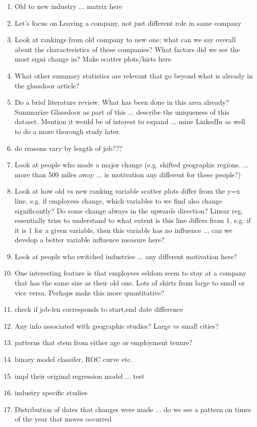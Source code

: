 \documentclass{amsart}[12pt]
\begin{document}
\begin{enumerate}
    \item Old to new industry ... matrix here 
    \item Let's focus on Leaving a company, not just different role in same company 
    \item Look at rankings from old company to new one; what can we say overall about 
         the characteristics of these companies?  What factors did we see the most signi
         change in? Make scatter plots/hists here 
    \item What other summary statistics are relevant that go beyond what is already in 
          the glassdoor article? 
    \item Do a brief literature review.  What has been done in this area already?
          Summarize Glassdoor as part of this ... describe the uniqueness of this dataset. 
          Mention it would be of interest to expand ... mine LinkedIn as well to do a 
          more thorough study later. 
    \item do reasons vary by length of job??? 
    \item Look at people who made a major change (e.g. shifted geographic regions. ... more than 500 miles 
          away ... is motivation any different for these people?)
    \item Look at how old vs new ranking variable scatter plots differ from the y=x line, 
        e.g. if employees change, which variables to we find also change significantly?  
          Do some change always in the upwards direction? Linear reg. essentially tries 
          to understand to what extent is this line differs from 1, e.g. if it is 1 for 
          a given variable, then this variable has no influence ... can we develop a 
          better variable influence measure here? 
    \item Look at people who switched industries ... any different motivation here? 
    \item One interesting feature is that employees seldom seem to stay at a company that has the 
          same size as their old one.  Lots of shirts from large to small or vice versa.  Perhaps 
          make this more quantitative? 
    \item  check if job-len corresponds to start,end date difference 
    \item Any info associated with geographic studies?  Large vs small cities? 
    \item  patterns that stem from either age or employment tenure? 
    \item binary model classifer, ROC curve etc. 
    \item impl their original regression model ... test 
    \item  industry specific studies 
    \item Distribution of dates that changes were made ... do we see a pattern on times of the 
          year that moves occurred 
\end{enumerate}
\end{document}

